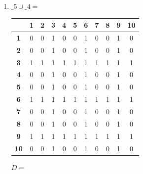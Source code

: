 \documentclass[a4paper,14pt]{extarticle}
\begin{document}
\begin{enumerate}[label=1.\arabic*.]
\begin{enumerate}[1) ]
		      \item $\_5 \cup \_4 = $  \begin{tabular}{|c|c|c|c|c|c|c|c|c|c|c|}
			            \hline
			                              & \textbf{1} & \textbf{2} & \textbf{3} & \textbf{4} & \textbf{5} & \textbf{6} & \textbf{7} & \textbf{8} & \textbf{9} & \textbf{10} \\
			            \hline\textbf{1}  & 0          & 0          & 1          & 0          & 0          & 1          & 0          & 0          & 1          & 0           \\
			            \hline\textbf{2}  & 0          & 0          & 1          & 0          & 0          & 1          & 0          & 0          & 1          & 0           \\
			            \hline\textbf{3}  & 1          & 1          & 1          & 1          & 1          & 1          & 1          & 1          & 1          & 1           \\
			            \hline\textbf{4}  & 0          & 0          & 1          & 0          & 0          & 1          & 0          & 0          & 1          & 0           \\
			            \hline\textbf{5}  & 0          & 0          & 1          & 0          & 0          & 1          & 0          & 0          & 1          & 0           \\
			            \hline\textbf{6}  & 1          & 1          & 1          & 1          & 1          & 1          & 1          & 1          & 1          & 1           \\
			            \hline\textbf{7}  & 0          & 0          & 1          & 0          & 0          & 1          & 0          & 0          & 1          & 0           \\
			            \hline\textbf{8}  & 0          & 0          & 1          & 0          & 0          & 1          & 0          & 0          & 1          & 0           \\
			            \hline\textbf{9}  & 1          & 1          & 1          & 1          & 1          & 1          & 1          & 1          & 1          & 1           \\
			            \hline\textbf{10} & 0          & 0          & 1          & 0          & 0          & 1          & 0          & 0          & 1          & 0           \\
			            \hline
		            \end{tabular}\bigbreak
		            $D = $ \begin{tabular}{|c|c|c|c|c|c|c|c|c|c|c|}

\end{tabular}
\end{enumerate}
\end{enumerate}
\end{document}
